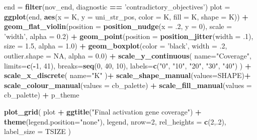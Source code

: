 \documentclass[]{book}
\newenvironment{Shaded}{\begin{snugshade}}{\end{snugshade}}
\newcommand{\DataTypeTok}[1]{\textcolor[rgb]{0.13,0.29,0.53}{#1}}
\newcommand{\DecValTok}[1]{\textcolor[rgb]{0.00,0.00,0.81}{#1}}
\newcommand{\FloatTok}[1]{\textcolor[rgb]{0.00,0.00,0.81}{#1}}
\newcommand{\KeywordTok}[1]{\textcolor[rgb]{0.13,0.29,0.53}{\textbf{#1}}}
\newcommand{\NormalTok}[1]{#1}
\newcommand{\OperatorTok}[1]{\textcolor[rgb]{0.81,0.36,0.00}{\textbf{#1}}}
\newcommand{\OtherTok}[1]{\textcolor[rgb]{0.56,0.35,0.01}{#1}}
\newcommand{\StringTok}[1]{\textcolor[rgb]{0.31,0.60,0.02}{#1}}
\begin{document}
\begin{Shaded}
\begin{Highlighting}[]
\NormalTok{end =}\StringTok{ }\KeywordTok{filter}\NormalTok{(nov_end, diagnostic }\OperatorTok{==}\StringTok{ 'contradictory_objectives'}\NormalTok{)}
\NormalTok{plot =}\StringTok{ }\KeywordTok{ggplot}\NormalTok{(end, }\KeywordTok{aes}\NormalTok{(}\DataTypeTok{x =}\NormalTok{ K, }\DataTypeTok{y =}\NormalTok{ uni_str_pos, }\DataTypeTok{color =}\NormalTok{ K, }\DataTypeTok{fill =}\NormalTok{ K, }\DataTypeTok{shape =}\NormalTok{ K)) }\OperatorTok{+}
\StringTok{  }\KeywordTok{geom_flat_violin}\NormalTok{(}\DataTypeTok{position =} \KeywordTok{position_nudge}\NormalTok{(}\DataTypeTok{x =} \FloatTok{.2}\NormalTok{, }\DataTypeTok{y =} \DecValTok{0}\NormalTok{), }\DataTypeTok{scale =} \StringTok{'width'}\NormalTok{, }\DataTypeTok{alpha =} \FloatTok{0.2}\NormalTok{) }\OperatorTok{+}
\StringTok{  }\KeywordTok{geom_point}\NormalTok{(}\DataTypeTok{position =} \KeywordTok{position_jitter}\NormalTok{(}\DataTypeTok{width =} \FloatTok{.1}\NormalTok{), }\DataTypeTok{size =} \FloatTok{1.5}\NormalTok{, }\DataTypeTok{alpha =} \FloatTok{1.0}\NormalTok{) }\OperatorTok{+}
\StringTok{  }\KeywordTok{geom_boxplot}\NormalTok{(}\DataTypeTok{color =} \StringTok{'black'}\NormalTok{, }\DataTypeTok{width =} \FloatTok{.2}\NormalTok{, }\DataTypeTok{outlier.shape =} \OtherTok{NA}\NormalTok{, }\DataTypeTok{alpha =} \FloatTok{0.0}\NormalTok{) }\OperatorTok{+}
\StringTok{  }\KeywordTok{scale_y_continuous}\NormalTok{(}
    \DataTypeTok{name=}\StringTok{"Coverage"}\NormalTok{,}
    \DataTypeTok{limits=}\KeywordTok{c}\NormalTok{(}\OperatorTok{-}\DecValTok{1}\NormalTok{, }\DecValTok{41}\NormalTok{),}
    \DataTypeTok{breaks=}\KeywordTok{seq}\NormalTok{(}\DecValTok{0}\NormalTok{, }\DecValTok{40}\NormalTok{, }\DecValTok{10}\NormalTok{),}
    \DataTypeTok{labels=}\KeywordTok{c}\NormalTok{(}\StringTok{"0"}\NormalTok{, }\StringTok{"10"}\NormalTok{, }\StringTok{"20"}\NormalTok{, }\StringTok{"30"}\NormalTok{, }\StringTok{"40"}\NormalTok{)}
\NormalTok{  ) }\OperatorTok{+}
\StringTok{  }\KeywordTok{scale_x_discrete}\NormalTok{(}
    \DataTypeTok{name=}\StringTok{"K"}
\NormalTok{  )}\OperatorTok{+}
\StringTok{  }\KeywordTok{scale_shape_manual}\NormalTok{(}\DataTypeTok{values=}\NormalTok{SHAPE)}\OperatorTok{+}
\StringTok{  }\KeywordTok{scale_colour_manual}\NormalTok{(}\DataTypeTok{values =}\NormalTok{ cb_palette) }\OperatorTok{+}
\StringTok{  }\KeywordTok{scale_fill_manual}\NormalTok{(}\DataTypeTok{values =}\NormalTok{ cb_palette) }\OperatorTok{+}
\StringTok{  }\NormalTok{p_theme}

\KeywordTok{plot_grid}\NormalTok{(}
\NormalTok{  plot }\OperatorTok{+}
\StringTok{    }\KeywordTok{ggtitle}\NormalTok{(}\StringTok{"Final activation gene coverage"}\NormalTok{) }\OperatorTok{+}
\StringTok{    }\KeywordTok{theme}\NormalTok{(}\DataTypeTok{legend.position=}\StringTok{"none"}\NormalTok{),}
\NormalTok{  legend,}
  \DataTypeTok{nrow=}\DecValTok{2}\NormalTok{,}
  \DataTypeTok{rel_heights =} \KeywordTok{c}\NormalTok{(}\DecValTok{2}\NormalTok{,.}\DecValTok{2}\NormalTok{),}
  \DataTypeTok{label_size =}\NormalTok{ TSIZE}
\NormalTok{)}
\end{Highlighting}
\end{Shaded}
\end{document}
